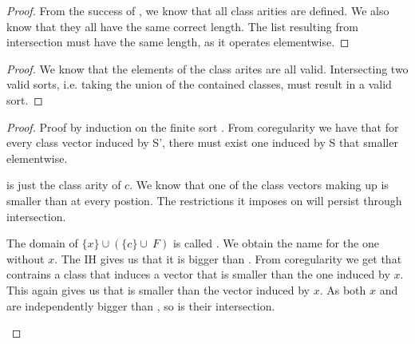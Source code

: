 \begin{lemma}
\end{lemma}
\begin{proof}
    From the success of , we know that all class arities are defined.
    We also know that they all have the same correct length.
    The list resulting from intersection must have the same length, as it operates elementwise.
\end{proof}

\begin{lemma}
\end{lemma}
\begin{proof}
    We know that the elements of the class arites are all valid.
    Intersecting two valid sorts, i.e. taking the union of the contained classes, must result in a valid sort.
\end{proof}

\begin{lemma}
\end{lemma}
\begin{proof}
    Proof by induction on the finite sort .
    From coregularity we have that for every class vector induced by S', there must exist one induced by S that smaller elementwise.
    \begin{description}[]
        \item [\(\{c\}\)]  is just the class arity of \(c\).
            We know that one of the class vectors making up  is smaller than  at every postion.
            The restrictions it imposes on  will persist through intersection.
        \item [\(\{x\}\cup(\{c\}\cup\ F)\)] The domain of \(\{x\}\cup(\{c\}\cup\ F)\) is called .
        We obtain the name  for the one without \(x\).
        The IH gives us that it is bigger than .
        From coregularity we get that  contrains a class that induces a vector that is smaller than the one induced by \(x\).
        This again gives us that  is smaller than the vector induced by \(x\).
        As both \(x\) and  are independently bigger than , so is their intersection.
    \end{description}
\end{proof}



